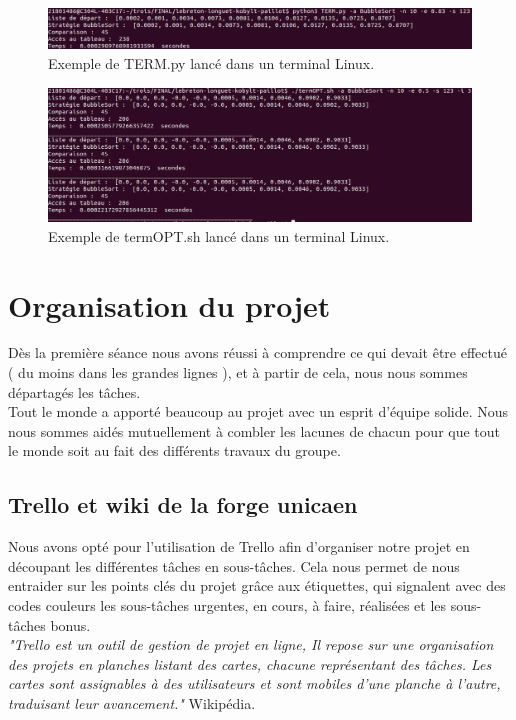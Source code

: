 \documentclass[10pt,a4paper]{article}
\begin{document}
        
        \begin{figure}[h]
            \caption{\scriptsize Exemple de TERM.py lancé dans un terminal Linux.}
            \centering
            \includegraphics[scale=0.35]{img/TERM.png}
        \end{figure}
        

        \begin{figure}[h]
            \caption{\scriptsize Exemple de termOPT.sh lancé dans un terminal Linux.}
            \centering
            \includegraphics[scale=0.35]{img/termOPT.png}
        \end{figure}
        

        \newpage
         
        
    \section{Organisation du projet}
        Dès la première séance nous avons réussi à comprendre ce qui devait être effectué ( du moins dans les grandes lignes ), et à partir de cela, nous nous sommes départagés les tâches.\\
        Tout le monde a apporté beaucoup au projet avec un esprit d'équipe solide. Nous nous sommes aidés mutuellement à combler les lacunes de chacun pour que tout le monde soit au fait des différents travaux du groupe.
      
    \subsection{Trello et wiki de la forge unicaen}
    
        Nous avons opté pour l'utilisation de Trello afin d'organiser notre projet en découpant les différentes tâches en sous-tâches. Cela nous permet de nous entraider sur les points clés du projet grâce aux étiquettes, qui signalent avec des codes couleurs les sous-tâches urgentes, en cours, à faire, réalisées et les sous-tâches bonus.\\
        \textit{"Trello est un outil de gestion de projet en ligne, Il repose sur une organisation des projets en planches listant des cartes, chacune représentant des tâches. Les cartes sont assignables à des utilisateurs et sont mobiles d'une planche à l'autre, traduisant leur avancement."} Wikipédia.\\
\end{document}

